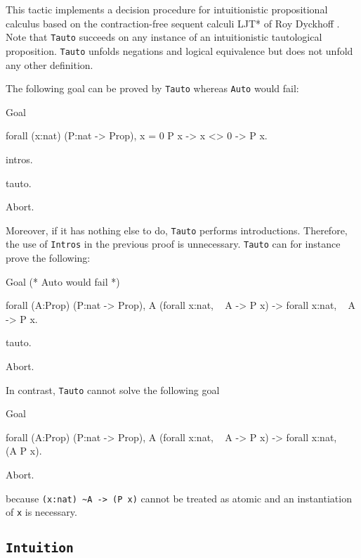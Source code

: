 This tactic implements a decision procedure for intuitionistic propositional
calculus based on the contraction-free sequent calculi LJT* of Roy Dyckhoff
\cite{Dyc92}. Note that {\tt Tauto} succeeds on any instance of an
intuitionistic tautological proposition. {\tt Tauto} unfolds negations
and logical equivalence but does not unfold any other definition.

The following goal can be proved by {\tt Tauto} whereas {\tt Auto}
would fail:

\begin{coq_example}
Goal

  forall (x:nat) (P:nat -> Prop), x = 0 \/ P x -> x <> 0 -> P x.

  intros.

  tauto.
\end{coq_example}
\begin{coq_eval}
Abort.
\end{coq_eval}

Moreover, if it has nothing else to do, {\tt Tauto} performs
introductions. Therefore, the use of {\tt Intros} in the previous
proof is unnecessary. {\tt Tauto} can for instance prove the
following:
\begin{coq_example}
Goal
 (* Auto would fail *)
  
  forall (A:Prop) (P:nat -> Prop),
    A \/ (forall x:nat, ~ A -> P x) -> forall x:nat, ~ A -> P x.

  tauto.
\end{coq_example}
\begin{coq_eval}
Abort.
\end{coq_eval}

\Rem In contrast, {\tt Tauto} cannot solve the following goal

\begin{coq_example*}
Goal

  forall (A:Prop) (P:nat -> Prop),
    A \/ (forall x:nat, ~ A -> P x) -> forall x:nat, ~ ~ (A \/ P x).
\end{coq_example*}
\begin{coq_eval}
Abort.
\end{coq_eval}

because \verb=(x:nat) ~A -> (P x)= cannot be treated as atomic and an
instantiation of \verb=x= is necessary.

\subsection{\tt Intuition {\tac}}
\label{Intuition}

